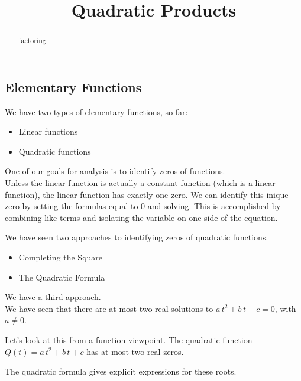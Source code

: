 \documentclass{ximera}
\title{Quadratic Products}
\begin{document}
\begin{abstract}
factoring
\end{abstract}
\maketitle







\subsection{Elementary Functions}

We have two types of elementary functions, so far:

\begin{itemize}
\item Linear functions
\item Quadratic functions
\end{itemize}

One of our goals for analysis is to identify zeros of functions. \\

Unless the linear function is actually a constant function (which is a linear function), the linear function has exactly one zero. We can identify this inique zero by setting the formulas equal to $0$ and solving.  This is accomplished by combining like terms and isolating the variable on one side of the equation.

We have seen two approaches to identifying zeros of quadratic functions.
\begin{itemize}
\item Completing the Square
\item {The Quadratic Formula}
\end{itemize}

We have a third approach. \\









We have seen that there are at most two real solutions to $a \, t^2 + b \, t + c = 0$, with $a \ne 0$. 

Let's look at this from a function viewpoint.  The quadratic function  $Q(t) = a \, t^2 + b \, t + c$ has at most two real zeros.  

The quadratic formula gives explicit expressions for these roots.
\end{document}
